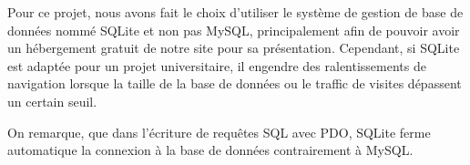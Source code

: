        \bigskip
        Pour ce projet, nous avons fait le choix d'utiliser le système de gestion de base de données nommé SQLite et non pas MySQL, principalement afin de pouvoir avoir un hébergement gratuit de notre site pour sa présentation. Cependant, si SQLite est adaptée pour un projet universitaire, il engendre des ralentissements de navigation lorsque la taille de la base de données ou le traffic de visites dépassent un certain seuil.

        \medskip
        On remarque, que dans l'écriture de requêtes SQL avec PDO, SQLite ferme automatique la connexion à la base de données contrairement à MySQL.

